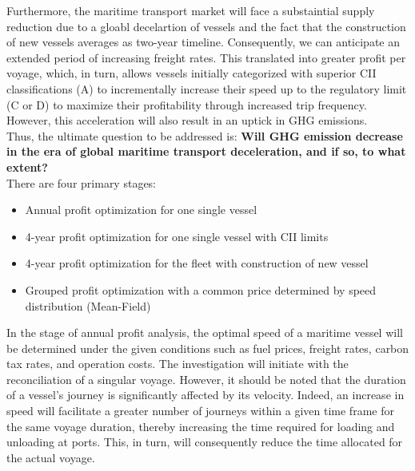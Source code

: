 \documentclass[a4paper,12pt]{article}
\begin{document}
Furthermore, the maritime transport market will face a substaintial supply reduction due to a gloabl decelartion of vessels and the fact that the construction of new vessels averages as two-year timeline.
Consequently, we can anticipate an extended period of increasing freight rates.
This translated into greater profit per voyage, which, in turn, allows vessels initially categorized with superior CII classifications (A) to incrementally increase their speed up to the regulatory limit (C or D) to maximize their profitability through increased trip frequency.
However, this acceleration will also result in an uptick in GHG emissions.\\

Thus, the ultimate question to be addressed is: \textbf{Will GHG emission decrease in the era of global maritime transport deceleration, and if so, to what extent?}\\

There are four primary stages:
\begin{itemize}
	\item Annual profit optimization for one single vessel
	\item 4-year profit optimization for one single vessel with CII limits
	\item 4-year profit optimization for the fleet with construction of new vessel
	\item Grouped profit optimization with a common price determined by speed distribution (Mean-Field) \\
\end{itemize}

In the stage of annual profit analysis, the optimal speed of a maritime vessel will be determined under the given conditions such as fuel prices, freight rates, carbon tax rates, and operation costs.
The investigation will initiate with the reconciliation of a singular voyage.
However, it should be noted that the duration of a vessel's journey is significantly affected by its velocity.
Indeed, an increase in speed will facilitate a greater number of journeys within a given time frame for the same voyage duration, thereby increasing the time required for loading and unloading at ports.
This, in turn, will consequently reduce the time allocated for the actual voyage.\\
\end{document}
